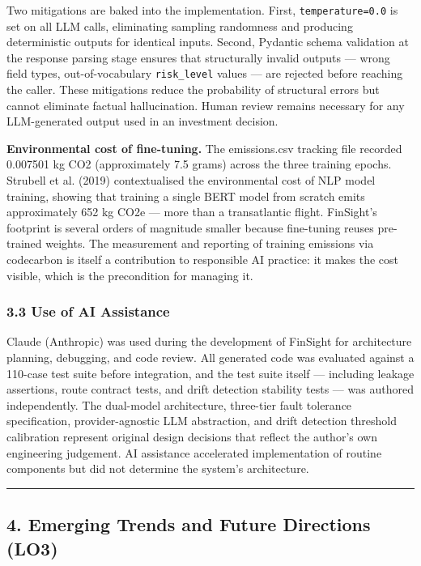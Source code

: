 \documentclass[11pt,a4paper]{article}
\begin{document}
Two mitigations are baked into the implementation. First, \texttt{temperature=0.0} is set on all LLM calls, eliminating sampling randomness and producing deterministic outputs for identical inputs. Second, Pydantic schema validation at the response parsing stage ensures that structurally invalid outputs — wrong field types, out-of-vocabulary \texttt{risk\_level} values — are rejected before reaching the caller. These mitigations reduce the probability of structural errors but cannot eliminate factual hallucination. Human review remains necessary for any LLM-generated output used in an investment decision.

\textbf{Environmental cost of fine-tuning.}
The emissions.csv tracking file recorded 0.007501 kg CO2 (approximately 7.5 grams) across the three training epochs. Strubell et al. (2019) contextualised the environmental cost of NLP model training, showing that training a single BERT model from scratch emits approximately 652 kg CO2e — more than a transatlantic flight. FinSight's footprint is several orders of magnitude smaller because fine-tuning reuses pre-trained weights. The measurement and reporting of training emissions via codecarbon is itself a contribution to responsible AI practice: it makes the cost visible, which is the precondition for managing it.

\subsubsection*{3.3 Use of AI Assistance}

Claude (Anthropic) was used during the development of FinSight for architecture planning, debugging, and code review. All generated code was evaluated against a 110-case test suite before integration, and the test suite itself — including leakage assertions, route contract tests, and drift detection stability tests — was authored independently. The dual-model architecture, three-tier fault tolerance specification, provider-agnostic LLM abstraction, and drift detection threshold calibration represent original design decisions that reflect the author's own engineering judgement. AI assistance accelerated implementation of routine components but did not determine the system's architecture.

\noindent\rule{\linewidth}{0.4pt}

\subsection*{4. Emerging Trends and Future Directions (LO3)}
\end{document}
